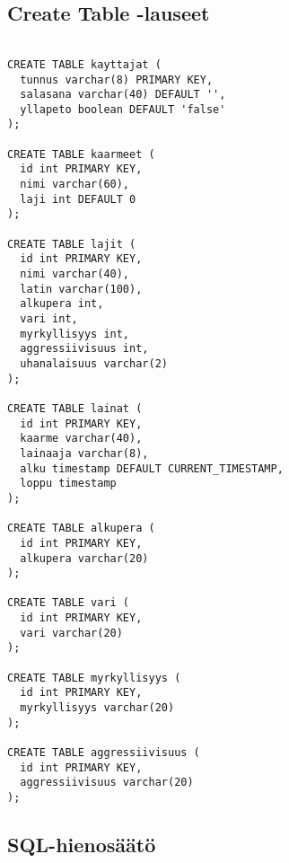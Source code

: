\documentclass[11pt]{article}
\begin{document}
\subsection{Create Table -lauseet} %

\begin{verbatim}

CREATE TABLE kayttajat (
  tunnus varchar(8) PRIMARY KEY,
  salasana varchar(40) DEFAULT '',
  yllapeto boolean DEFAULT 'false'
);

CREATE TABLE kaarmeet (
  id int PRIMARY KEY,
  nimi varchar(60),
  laji int DEFAULT 0
);

CREATE TABLE lajit (
  id int PRIMARY KEY,
  nimi varchar(40),
  latin varchar(100),
  alkupera int,
  vari int,
  myrkyllisyys int,
  aggressiivisuus int,
  uhanalaisuus varchar(2)
);

CREATE TABLE lainat (
  id int PRIMARY KEY,
  kaarme varchar(40),
  lainaaja varchar(8),
  alku timestamp DEFAULT CURRENT_TIMESTAMP,
  loppu timestamp
);

CREATE TABLE alkupera (
  id int PRIMARY KEY,
  alkupera varchar(20)
);

CREATE TABLE vari (
  id int PRIMARY KEY,
  vari varchar(20)
);

CREATE TABLE myrkyllisyys (
  id int PRIMARY KEY,
  myrkyllisyys varchar(20)
);

CREATE TABLE aggressiivisuus (
  id int PRIMARY KEY,
  aggressiivisuus varchar(20)
);

\end{verbatim}

\subsection{SQL-hienosäätö} %
\end{document}
